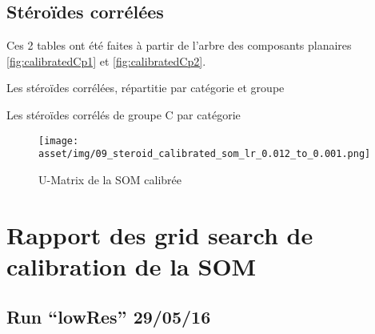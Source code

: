 \clearpage
\begin{landscape}


\section{Stéroïdes corrélées}
\label{sct:steroidCorrelation}

Ces 2 tables ont été faites à partir de l'arbre des composants planaires \autoref{fig:calibratedCp1} et \autoref{fig:calibratedCp2}.

    \begin{table}[H]
        \centering
        
        \caption{Les stéroïdes corrélées, répartitie par catégorie et groupe}
        \label{tab:somCorrelation}
    \end{table}

    \begin{table}[H]
        \centering
        
        \caption{Les stéroïdes corrélés de groupe C par catégorie}
        \label{tab:somSousCorrelation}
    \end{table}

	\begin{figure}[H]
	    \centering
	    \texttt{[image: asset/img/09\_steroid\_calibrated\_som\_lr\_0.012\_to\_0.001.png]}
	    \caption{U-Matrix de la SOM calibrée}
	    \label{fig:calibratedSom}
	\end{figure}

\end{landscape}

\section{Rapport des grid search de calibration de la SOM}

\subsection{Run ``lowRes'' 29/05/16}

	\clearpage


